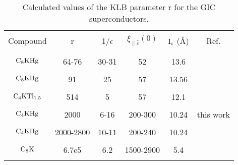 \begin{table}
\caption[Calculated values of the KLB parameter r for a number of
transition    metal      dichalcogenides    and       their   intercalation
compounds.]{Calculated values  of the   KLB  parameter r   for the GIC superconductors.}
\label{klbgics}
\begin{center}
\begin{tabular}{|c|ccccc|}
\hline
& & & & & \\
Compound & r & 1/$\epsilon$ & $\xi_{\parallel \hat{c}}(0)$ & $\rm I_c$ (\AA) & Ref.\\
& & & & & \\
\hline
& & & & & \\
$\rm C_8KHg$ & 64-76& 30-31& 52 & 13.6  & \cite{koike81,tanuma81} \\
& & & & & \\
$\rm C_8KHg$ & 91& 25& 57 & 13.56  & \cite{pendrys83} \\
& & & & & \\
$\rm C_4KTl_{1.5}$ & 514& 5 &57 & 12.1 & \cite{pendrys83,vogel81} \\
& & & & & \\
$\rm C_4KHg$ & 2000& 6-16& 200-300 & 10.24  & this work \\
& & & & & \\
$\rm C_4KHg$ & 2000-2800& 10-11& 200-240 & 10.24  & \cite{iye83} \\
& & & & & \\
$\rm C_8K$ & 6.7e5& 6.2 & 1500-2900& 5.4  & \cite{koike81,koike80} \\
& & & & & \\
\hline
\end{tabular}
\end{center}
\end{table}

